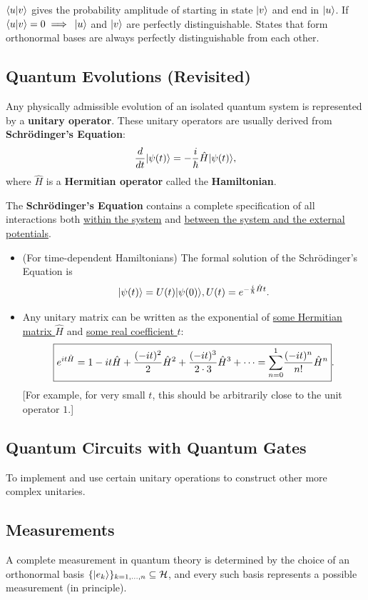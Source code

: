 \documentclass[12pt]{article}
\begin{document}
\begin{proposition} $\bk{u}{v}$ gives the probability amplitude of starting in state $\Ket{v}$ and end in $\Ket{u}$. If $\bk{u}{v} = 0\implies$ $\Ket{u}$ and $\Ket{v}$ are perfectly distinguishable. States that form orthonormal bases are always perfectly distinguishable from each other.
\end{proposition}

\subsection{Quantum Evolutions (Revisited)}
Any physically admissible evolution of an isolated quantum system is represented by a \textbf{unitary operator}. These unitary operators are usually derived from \textbf{Schrödinger's Equation}: $$
\frac{d}{dt}\Ket{\psi(t)} = -\frac{i}{\hbar}\hat{H}\Ket{\psi(t)},
$$ where \underline{$\hat{H}$} is a \textbf{Hermitian operator} called the \textbf{Hamiltonian}.

\begin{proposition}
The \textbf{Schrödinger's Equation} contains a complete specification of all interactions both \underline{within the system} and \underline{between the system and the external potentials}.
\begin{itemize}
    \item (For time-dependent Hamiltonians) The formal solution of the Schrödinger's Equation is $$
    \Ket{\psi(t)} = U(t)\Ket{\psi(0)}, U(t) = e^{-\frac{i}{\hbar}\hat{H}t}.
    $$
    \item Any unitary matrix can be written as the exponential of \underline{some Hermitian matrix $\hat{H}$} and \underline{some real coefficient $t$}: $$
    \boxed{e^{it\hat{H}} = 1-it\hat{H} + \frac{(-it)^2}{2}\hat{H}^2 + \frac{(-it)^3}{2\cdot 3}\hat{H}^3 + \cdots = \Sum{n}{0}{1}\frac{(-it)^n}{n!}\hat{H}^n}.
    $$ [For example, for very small $t$, this should be arbitrarily close to the unit operator $1$.]
\end{itemize}
\end{proposition}

\subsection{Quantum Circuits with Quantum Gates}
To implement and use certain unitary operations to construct other more complex unitaries.

\subsection{Measurements}
A complete measurement in quantum theory is determined by the choice of an orthonormal basis $\{\Ket{e_{k}}\}_{k= 1,\ldots, n}\subseteq \HHH$, and every such basis represents a possible measurement (in principle).
\end{document}
